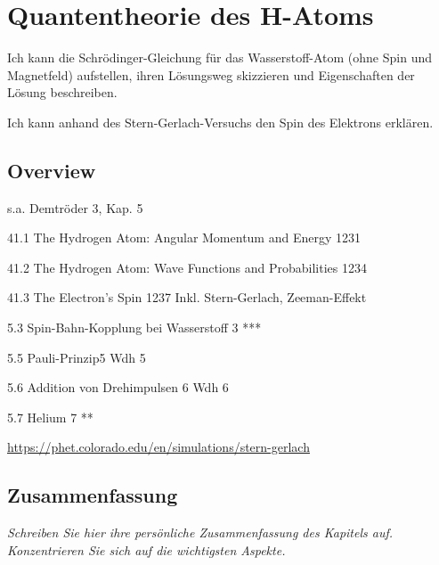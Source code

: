 \renewcommand{\lastmod}{10. September 2024}
\renewcommand{\chapterauthors}{Markus Lippitz}

\chapter{Quantentheorie des H-Atoms}




Ich kann die Schrödinger-Gleichung für das Wasserstoff-Atom (ohne Spin und Magnetfeld) aufstellen, ihren Lösungsweg skizzieren und Eigenschaften der Lösung beschreiben.

Ich kann anhand des Stern-Gerlach-Versuchs den Spin des Elektrons erklären.


\section{Overview}

s.a. Demtröder 3, Kap. 5

41.1 The Hydrogen Atom: Angular Momentum and Energy 1231

41.2 The Hydrogen Atom: Wave Functions and Probabilities 1234

41.3 The Electron's Spin 1237
Inkl. Stern-Gerlach, Zeeman-Effekt

5.3 Spin-Bahn-Kopplung bei Wasserstoff 3	***	

5.5 Pauli-Prinzip5	Wdh	5 

5.6 Addition von Drehimpulsen 6	Wdh	6 

5.7 Helium 7	**	


\url{https://phet.colorado.edu/en/simulations/stern-gerlach}







\section{Zusammenfassung}

\textit{Schreiben Sie hier ihre persönliche Zusammenfassung des Kapitels auf. Konzentrieren Sie sich auf die wichtigsten Aspekte.}

\vspace*{10cm}



\printbibliography[segment=\therefsegment,heading=subbibliography]
